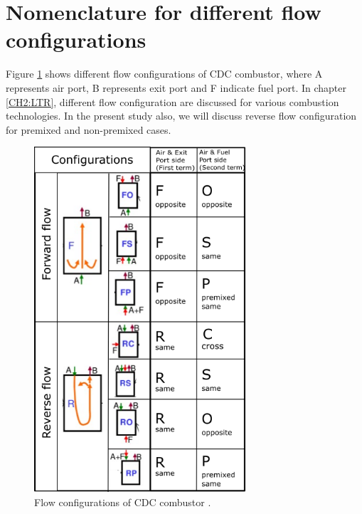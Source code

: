 \section{Nomenclature for different flow configurations}
Figure \ref{FlowConfig} shows different flow configurations of CDC combustor, where A represents air port, B represents exit port and F indicate fuel port. In chapter \ref{CH2:LTR}, different flow configuration are discussed for various combustion technologies. In the present study also, we will discuss reverse flow configuration for premixed and non-premixed cases.
\begin{figure}[ht]
	\centering
	\includegraphics[width=0.7\textwidth]{Chapter1/Images/FlowConfiguration.png}
	\caption[Flow configurations of CDC combustor]{Flow configurations of CDC combustor \cite{VAThesis2011}.}
	\label{FlowConfig}
\end{figure}